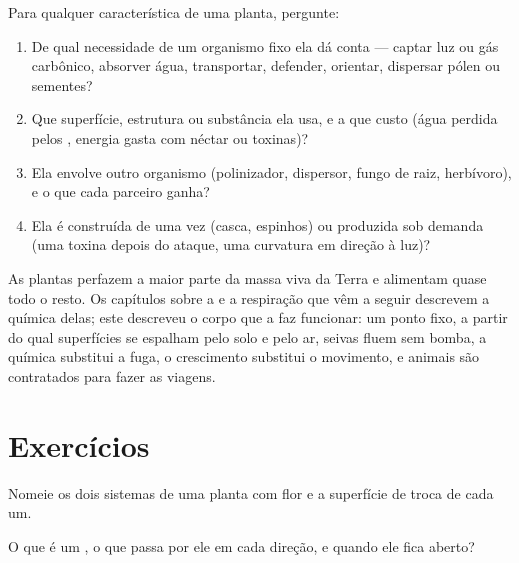 \begin{method}\label{met:g12:plant-rooted-life:read}
Para qualquer característica de uma planta, pergunte:
\begin{enumerate}
  \item De qual necessidade de um organismo fixo ela dá conta ---
        captar luz ou gás carbônico, absorver água, transportar,
        defender, orientar, dispersar pólen ou sementes?
  \item Que superfície, estrutura ou substância ela usa, e a que custo
        (água perdida pelos , energia gasta com néctar ou
        toxinas)?
  \item Ela envolve outro organismo (polinizador, dispersor, fungo de
        raiz, herbívoro), e o que cada parceiro ganha?
  \item Ela é construída de uma vez (casca, espinhos) ou produzida sob
        demanda (uma toxina depois do ataque, uma curvatura em direção
        à luz)?
\end{enumerate}
\end{method}

\begin{remark}\label{rem:g12:plant-rooted-life:half}
As plantas perfazem a maior parte da massa viva da Terra e alimentam
quase todo o resto. Os capítulos sobre a  e a respiração
que vêm a seguir descrevem a química delas; este descreveu o corpo que
a faz funcionar: um ponto fixo, a partir do qual superfícies se
espalham pelo solo e pelo ar, seivas fluem sem bomba, a química
substitui a fuga, o crescimento substitui o movimento, e animais são
contratados para fazer as viagens.
\end{remark}

\section{Exercícios}

\begin{exercise}[$\star$]\label{exo:g12:plant-rooted-life:1}
Nomeie os dois sistemas de uma planta com flor e a superfície de troca
de cada um.
\end{exercise}

\begin{exercise}[$\star$]\label{exo:g12:plant-rooted-life:2}
O que é um , o que passa por ele em cada direção, e quando ele
fica aberto?
\end{exercise}

